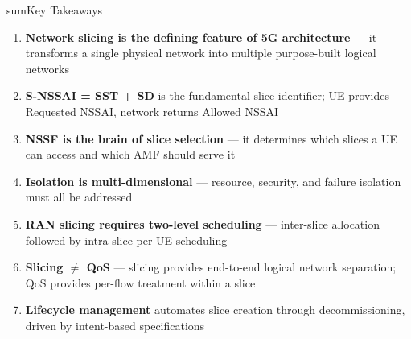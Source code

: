 \begin{CNbox}[unbreakable]{sum}{Key Takeaways}

\begin{enumerate}
\def\labelenumi{\arabic{enumi}.}
\tightlist
\item
  \textbf{Network slicing is the defining feature of 5G architecture} — it transforms a single physical network into multiple purpose-built logical networks
\item
  \textbf{S-NSSAI = SST + SD} is the fundamental slice identifier; UE provides Requested NSSAI, network returns Allowed NSSAI
\item
  \textbf{NSSF is the brain of slice selection} — it determines which slices a UE can access and which AMF should serve it
\item
  \textbf{Isolation is multi-dimensional} — resource, security, and failure isolation must all be addressed
\item
  \textbf{RAN slicing requires two-level scheduling} — inter-slice allocation followed by intra-slice per-UE scheduling
\item
  \textbf{Slicing \ensuremath{\neq} QoS} — slicing provides end-to-end logical network separation; QoS provides per-flow treatment within a slice
\item
  \textbf{Lifecycle management} automates slice creation through decommissioning, driven by intent-based specifications
\end{enumerate}

\end{CNbox}
